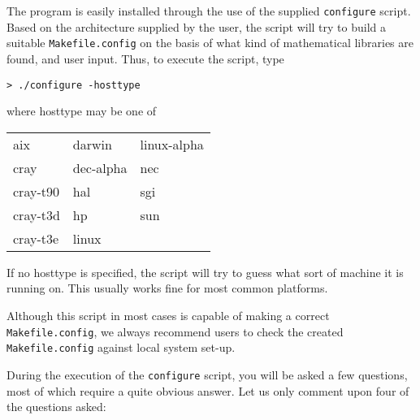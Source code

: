 The program is easily installed through the use of the supplied
\verb|configure| script. Based on the
architecture supplied by the user, the
script will try to build a suitable
\verb|Makefile.config| on the
basis of what kind of mathematical libraries are found, and user
input. Thus, to execute the script, type
\begin{verbatim}
> ./configure -hosttype
\end{verbatim}
where hosttype may be one of

\bigskip

\begin{tabular}{lll}
aix \hspace{3cm} & darwin \hspace{3cm} & linux-alpha\\
cray             & dec-alpha             & nec\\
cray-t90         & hal                   & sgi\\
cray-t3d         & hp                    & sun\\
cray-t3e         & linux                 &\\\end{tabular}

\bigskip

If no hosttype is specified, the script will try to guess what sort of
machine it is running on. This usually works fine for most common
platforms.

Although this script in most cases is capable of making a correct
\verb|Makefile.config|, we always recommend users to check the created
\verb|Makefile.config| against local system set-up. 

During the execution of the \verb|configure| script, you will be
asked a few questions, most of which require a quite obvious
answer. Let us only comment upon four of the questions asked:

